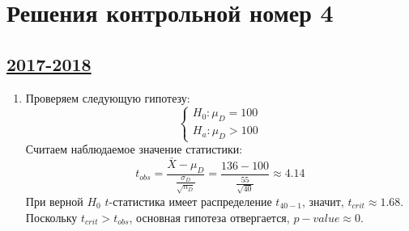 \thispagestyle{empty}
\section{Решения контрольной номер 4}

\subsection[2017-2018]{\hyperref[sec:kr_04_2017_2018]{2017-2018}}
\label{sec:sol_kr_04_2017_2018}

\begin{enumerate}
\item Проверяем следующую гипотезу:
\[
\begin{cases}
H_0: \mu_{D} = 100 \\
H_a: \mu_{D} > 100
\end{cases}
\]
Считаем наблюдаемое значение статистики:
\[
t_{obs} = \frac{\bar X - \mu_{D}}{\frac{\sigma_D}{\sqrt{n_D}}} = \frac{136 - 100}{\frac{55}{\sqrt{40}}} \approx 4.14
\]
При верной $H_0$ $t$-статистика имеет распределение $t_{40 - 1}$, значит, $t_{crit} \approx 1.68$.
Поскольку $t_{crit} > t_{obs}$, основная гипотеза отвергается, $p-value \approx 0$.


\end{enumerate}
